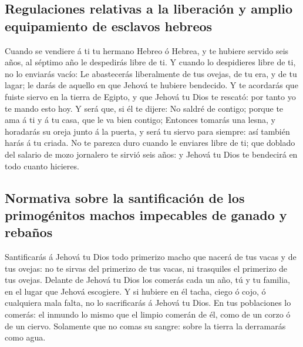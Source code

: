 \hypertarget{regulaciones-relativas-a-la-liberaciuxf3n-y-amplio-equipamiento-de-esclavos-hebreos}{%
\subsection{Regulaciones relativas a la liberación y amplio equipamiento
de esclavos
hebreos}\label{regulaciones-relativas-a-la-liberaciuxf3n-y-amplio-equipamiento-de-esclavos-hebreos}}

 Cuando se vendiere á ti tu hermano Hebreo ó Hebrea, y te
hubiere servido seis años, al séptimo año le despedirás libre de ti.
 Y cuando lo despidieres libre de ti, no lo enviarás
vacío:  Le abastecerás liberalmente de tus ovejas, de tu
era, y de tu lagar; le darás de aquello en que Jehová te hubiere
bendecido.  Y te acordarás que fuiste siervo en la tierra
de Egipto, y que Jehová tu Dios te rescató: por tanto yo te mando esto
hoy.  Y será que, si él te dijere: No saldré de contigo;
porque te ama á ti y á tu casa, que le va bien contigo; 
Entonces tomarás una lesna, y horadarás su oreja junto á la puerta, y
será tu siervo para siempre: así también harás á tu criada.
 No te parezca duro cuando le enviares libre de ti; que
doblado del salario de mozo jornalero te sirvió seis años: y Jehová tu
Dios te bendecirá en todo cuanto hicieres.

\hypertarget{normativa-sobre-la-santificaciuxf3n-de-los-primoguxe9nitos-machos-impecables-de-ganado-y-rebauxf1os}{%
\subsection{Normativa sobre la santificación de los primogénitos machos
impecables de ganado y
rebaños}\label{normativa-sobre-la-santificaciuxf3n-de-los-primoguxe9nitos-machos-impecables-de-ganado-y-rebauxf1os}}

 Santificarás á Jehová tu Dios todo primerizo macho que
nacerá de tus vacas y de tus ovejas: no te sirvas del primerizo de tus
vacas, ni trasquiles el primerizo de tus ovejas.  Delante
de Jehová tu Dios los comerás cada un año, tú y tu familia, en el lugar
que Jehová escogiere.  Y si hubiere en él tacha, ciego ó
cojo, ó cualquiera mala falta, no lo sacrificarás á Jehová tu Dios.
 En tus poblaciones lo comerás: el inmundo lo mismo que
el limpio comerán de él, como de un corzo ó de un ciervo.
 Solamente que no comas su sangre: sobre la tierra la
derramarás como agua.

